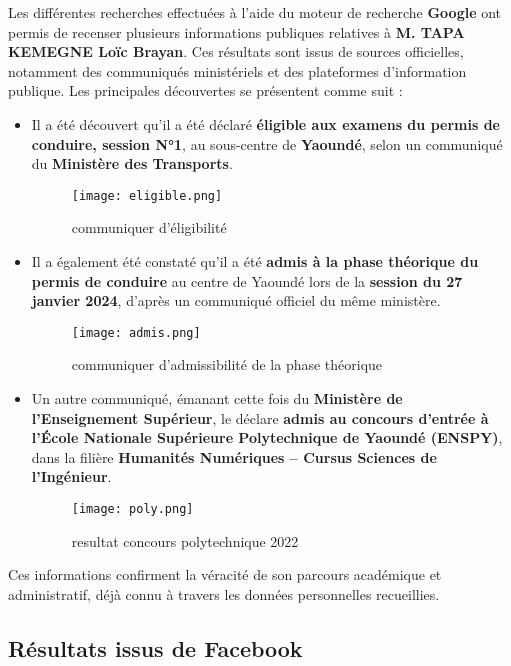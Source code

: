 \documentclass[12pt, a4em]{article}
\begin{document}
	Les différentes recherches effectuées à l’aide du moteur de recherche \textbf{Google} ont permis de recenser plusieurs informations publiques relatives à \textbf{M. TAPA KEMEGNE Loïc Brayan}. 
	Ces résultats sont issus de sources officielles, notamment des communiqués ministériels et des plateformes d’information publique. 
	Les principales découvertes se présentent comme suit :
	
	\begin{itemize}
		\item Il a été découvert qu’il a été déclaré \textbf{éligible aux examens du permis de conduire, session N°1}, au sous-centre de \textbf{Yaoundé}, selon un communiqué du \textbf{Ministère des Transports}.
		  \begin{figure}[h]
		 			\centering
		 			\texttt{[image: eligible.png]}
		 			\caption{communiquer d'éligibilité}
		 		\end{figure}
		
		\item Il a également été constaté qu’il a été \textbf{admis à la phase théorique du permis de conduire} au centre de Yaoundé lors de la \textbf{session du 27 janvier 2024}, d’après un communiqué officiel du même ministère.
		\vspace{2cm}
		
		\begin{figure}[h]
			\centering
			\texttt{[image: admis.png]}
			\caption{communiquer d'admissibilité de la phase théorique}
		\end{figure}
		\item Un autre communiqué, émanant cette fois du \textbf{Ministère de l’Enseignement Supérieur}, le déclare \textbf{admis au concours d’entrée à l’École Nationale Supérieure Polytechnique de Yaoundé (ENSPY)}, dans la filière \textbf{Humanités Numériques – Cursus Sciences de l’Ingénieur}.
		
		\begin{figure}[h]
			\centering
			\texttt{[image: poly.png]}
			\caption{resultat concours polytechnique 2022}
		\end{figure}
	\end{itemize}
	
	Ces informations confirment la véracité de son parcours académique et administratif, déjà connu à travers les données personnelles recueillies.
	
	\subsection{Résultats issus de Facebook}
	
\end{document}
